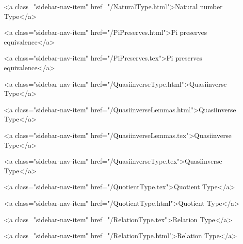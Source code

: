       
        
          <a class="sidebar-nav-item" href="/NaturalType.html">Natural number Type</a>
        
      
    
      
        
          <a class="sidebar-nav-item" href="/PiPreserves.html">Pi preserves equivalence</a>
        
      
    
      
        
          <a class="sidebar-nav-item" href="/PiPreserves.tex">Pi preserves equivalence</a>
        
      
    
      
        
          <a class="sidebar-nav-item" href="/QuasiinverseType.html">Quasiinverse Type</a>
        
      
    
      
        
          <a class="sidebar-nav-item" href="/QuasiinverseLemmas.html">Quasiinverse Type</a>
        
      
    
      
        
          <a class="sidebar-nav-item" href="/QuasiinverseLemmas.tex">Quasiinverse Type</a>
        
      
    
      
        
          <a class="sidebar-nav-item" href="/QuasiinverseType.tex">Quasiinverse Type</a>
        
      
    
      
        
          <a class="sidebar-nav-item" href="/QuotientType.tex">Quotient Type</a>
        
      
    
      
        
          <a class="sidebar-nav-item" href="/QuotientType.html">Quotient Type</a>
        
      
    
      
        
          <a class="sidebar-nav-item" href="/RelationType.tex">Relation Type</a>
        
      
    
      
        
          <a class="sidebar-nav-item" href="/RelationType.html">Relation Type</a>
        
